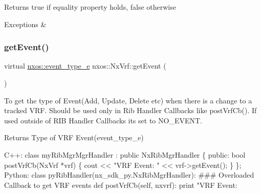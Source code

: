 \begin{DoxyReturn}{Returns}
true if equality property holds, false otherwise
\end{DoxyReturn}

\begin{DoxyCode}
\end{DoxyCode}



\begin{DoxyExceptions}{Exceptions}
{\em } & \\
\hline
\end{DoxyExceptions}
\mbox{\label{classnxos_1_1_nx_vrf_a42bdba27e42981d74066a72c24809c98}} 
\subsubsection{\texorpdfstring{get\+Event()}{getEvent()}}
{\footnotesize\ttfamily virtual \mbox{\hyperlink{namespacenxos_af9a9040b7681199d386e94eb888018cb}{nxos\+::event\+\_\+type\+\_\+e}} nxos\+::\+Nx\+Vrf\+::get\+Event (\begin{DoxyParamCaption}{ }\end{DoxyParamCaption})\hspace{0.3cm}{\ttfamily [pure virtual]}}

To get the type of Event(\+Add, Update, Delete etc) when there is a change to a tracked V\+RF. Should be used only in Rib Handler Callbacks like post\+Vrf\+Cb(). If used outside of R\+IB Handler Callbacks its set to N\+O\+\_\+\+E\+V\+E\+NT.

\begin{DoxyReturn}{Returns}
Type of V\+RF Event(event\+\_\+type\+\_\+e)
\end{DoxyReturn}

\begin{DoxyCode}
C++:
   \textcolor{keyword}{class }myRibMgrMgrHandler : \textcolor{keyword}{public} NxRibMgrHandler \{
      \textcolor{keyword}{public}:
         \textcolor{keywordtype}{bool} postVrfCb(NxVrf *vrf) \{
              cout << \textcolor{stringliteral}{"VRF Event: "} << vrf->getEvent();
         \}
   \};
Python:
   \textcolor{keyword}{class }pyRibHandler(nx\_sdk\_py.NxRibMgrHandler):
\textcolor{preprocessor}{   ### Overloaded Callback to get VRF events}
         def postVrfCb(self, nxvrf):
             print "VRF Event: %
\end{DoxyCode}
 \mbox{\label{classnxos_1_1_nx_vrf_a4ab30d5ff7a1d5d2abbab21652cd59fa}} 
